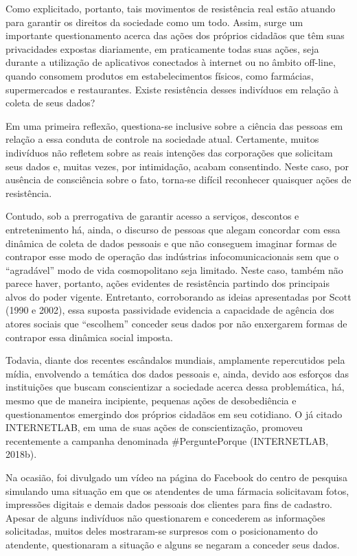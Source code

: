 Como explicitado, portanto, tais movimentos de resistência real estão
atuando para garantir os direitos da sociedade como um todo. Assim,
surge um importante questionamento acerca das ações dos próprios
cidadãos que têm suas privacidades expostas diariamente, em praticamente
todas suas ações, seja durante a utilização de aplicativos conectados à
internet ou no âmbito off-line, quando consomem produtos em
estabelecimentos físicos, como farmácias, supermercados e restaurantes.
Existe resistência desses indivíduos em relação à coleta de seus dados?

Em uma primeira reflexão, questiona-se inclusive sobre a ciência das
pessoas em relação a essa conduta de controle na sociedade atual.
Certamente, muitos indivíduos não refletem sobre as reais intenções das
corporações que solicitam seus dados e, muitas vezes, por intimidação,
acabam consentindo. Neste caso, por ausência de consciência sobre o
fato, torna-se difícil reconhecer quaisquer ações de resistência.

Contudo, sob a prerrogativa de garantir acesso a serviços, descontos e
entretenimento há, ainda, o discurso de pessoas que alegam concordar com
essa dinâmica de coleta de dados pessoais e que não conseguem imaginar
formas de contrapor esse modo de operação das indústrias
infocomunicacionais sem que o ``agradável'' modo de vida cosmopolitano
seja limitado. Neste caso, também não parece haver, portanto, ações
evidentes de resistência partindo dos principais alvos do poder vigente.
Entretanto, corroborando as ideias apresentadas por Scott (1990 e 2002),
essa suposta passividade evidencia a capacidade de agência dos atores
sociais que ``escolhem'' conceder seus dados por não enxergarem formas
de contrapor essa dinâmica social imposta.

Todavia, diante dos recentes escândalos mundiais, amplamente
repercutidos pela mídia, envolvendo a temática dos dados pessoais e,
ainda, devido aos esforços das instituições que buscam conscientizar a
sociedade acerca dessa problemática, há, mesmo que de maneira
incipiente, pequenas ações de desobediência e questionamentos emergindo
dos próprios cidadãos em seu cotidiano. O já citado INTERNETLAB, em uma
de suas ações de conscientização, promoveu recentemente a campanha
denominada \#PerguntePorque (INTERNETLAB, 2018b).

Na ocasião, foi divulgado um vídeo na página do Facebook do centro de
pesquisa simulando uma situação em que os atendentes de uma fármacia
solicitavam fotos, impressões digitais e demais dados pessoais dos
clientes para fins de cadastro. Apesar de alguns indivíduos não
questionarem e concederem as informações solicitadas, muitos deles
mostraram-se surpresos com o posicionamento do atendente, questionaram a
situação e alguns se negaram a conceder seus dados.

